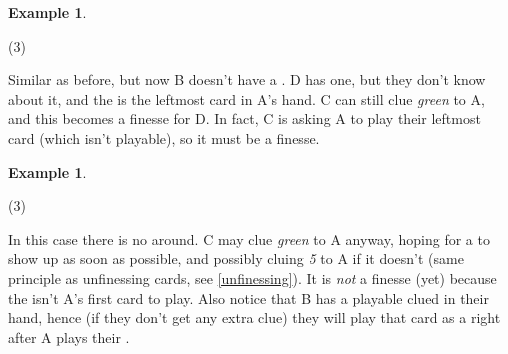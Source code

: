 \documentclass[a4paper]{article}
\theoremstyle{plain}
\theoremstyle{definition}
\newtheorem{example}[theorem]{Example}
\begin{document}
\begin{example}
	\hfill
	\begin{tasks}(3)
		\task[+]      
		\task[A]    
		\task[B]    
		\task[C]    
		\task[D]    
		\task[E]    
	\end{tasks}
	
	Similar as before, but now B doesn't have a . D has one, but they don't know about it, and the  is the leftmost card in A's hand. C can still clue \textit{green} to A, and this becomes a finesse for D. In fact, C is asking A to play their leftmost card (which isn't playable), so it must be a finesse.
\end{example}

%	

\begin{example}
	\hfill
	\begin{tasks}(3)
		\task[+]      
		\task[A]    
		\task[B]    
		\task[C]    
		\task[D]    
		\task[E]    
	\end{tasks}
	
	In this case there is no  around. C may clue \textit{green} to A anyway, hoping for a  to show up as soon as possible, and possibly cluing \textit{5} to A if it doesn't (same principle as unfinessing cards, see \ref{unfinessing}). It is \textit{not} a finesse (yet) because the  isn't A's first card to play. Also notice that B has a playable clued  in their hand, hence (if they don't get any extra clue) they will play that card as a  right after A plays their .
\end{example}
\end{document}
